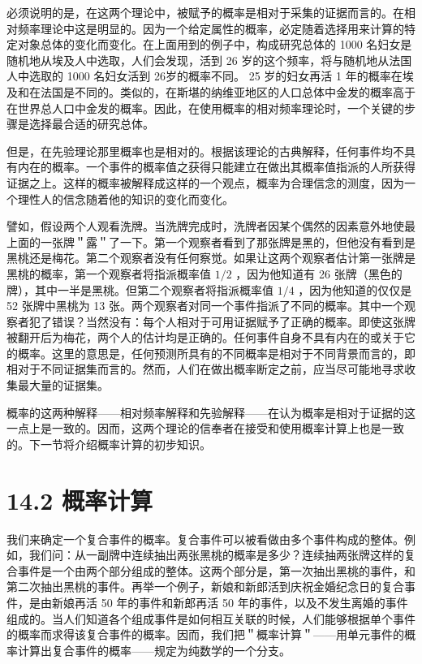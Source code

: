 必须说明的是，在这两个理论中，被赋予的概率是相对于采集的证据而言的。在相对频率理论中这是明显的。因为一个给定属性的概率，必定随着选择用来计算的特定对象总体的变化而变化。在上面用到的例子中，构成研究总体的 1000 名妇女是随机地从埃及人中选取，人们会发现，活到 26 岁的这个频率，将与随机地从法国人中选取的 1000 名妇女活到 26岁的概率不同。 25 岁的妇女再活 1 年的概率在埃及和在法国是不同的。类似的，在斯堪的纳维亚地区的人口总体中金发的概率高于在世界总人口中金发的概率。因此，在使用概率的相对频率理论时，一个关键的步骤是选择最合适的研究总体。

但是，在先验理论那里概率也是相对的。根据该理论的古典解释，任何事件均不具有内在的概率。一个事件的概率值之获得只能建立在做出其概率值指派的人所获得证据之上。这样的概率被解释成这样的一个观点，概率为合理信念的测度，因为一个理性人的信念随着他的知识的变化而变化。

譬如，假设两个人观看洗牌。当洗牌完成时，洗牌者因某个偶然的因素意外地使最上面的一张牌＂露＂了一下。第一个观察者看到了那张牌是黑的，但他没有看到是黑桃还是梅花。第二个观察者没有任何察觉。如果让这两个观察者估计第一张牌是黑桃的概率，第一个观察者将指派概率值 $1 / 2$ ，因为他知道有 26 张牌（黑色的牌），其中一半是黑桃。但第二个观察者将指派概率值 $1 / 4$ ，因为他知道的仅仅是 52 张牌中黑桃为 13 张。两个观察者对同一个事件指派了不同的概率。其中一个观察者犯了错误？当然没有：每个人相对于可用证据赋予了正确的概率。即使这张牌被翻开后为梅花，两个人的估计均是正确的。任何事件自身不具有内在的或关于它的概率。这里的意思是，任何预测所具有的不同概率是相对于不同背景而言的，即相对于不同证据集而言的。然而，人们在做出概率断定之前，应当尽可能地寻求收集最大量的证据集。

概率的这两种解释——相对频率解释和先验解释——在认为概率是相对于证据的这一点上是一致的。因而，这两个理论的信奉者在接受和使用概率计算上也是一致的。下一节将介绍概率计算的初步知识。

\section*{14.2 概率计算}
我们来确定一个复合事件的概率。复合事件可以被看做由多个事件构成的整体。例如，我们问：从一副牌中连续抽出两张黑桃的概率是多少？连续抽两张牌这样的复合事件是一个由两个部分组成的整体。这两个部分是，第一次抽出黑桃的事件，和第二次抽出黑桃的事件。再举一个例子，新娘和新郎活到庆祝金婚纪念日的复合事件，是由新娘再活 50 年的事件和新郎再活 50 年的事件，以及不发生离婚的事件组成的。当人们知道各个组成事件是如何相互关联的时候，人们能够根据单个事件的概率而求得该复合事件的概率。因而，我们把＂概率计算＂——用单元事件的概率计算出复合事件的概率——规定为纯数学的一个分支。

